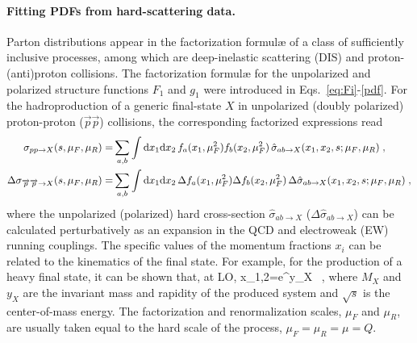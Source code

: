 \paragraph*{Fitting PDFs from hard-scattering data.} 
Parton distributions appear in the factorization formul{\ae} of a class of 
sufficiently inclusive processes, among which are deep-inelastic scattering 
(DIS) and proton-(anti)proton collisions.
%
The factorization formul{\ae} for the unpolarized and polarized structure 
functions $F_1$ and $g_1$ were introduced in Eqs.~\eqref{eq:Fi}-\eqref{pdf}.
%
For the hadroproduction of a generic final-state $X$ in unpolarized 
(doubly polarized) proton-proton ($\overrightarrow{p}\overrightarrow{p}$) 
collisions, the corresponding factorized expressions read
\begin{align}
\sigma_{pp\to X}(s,\mu_F,\mu_R)=&\sum_{a,b}\int {\rm d}x_1 {\rm d}x_2\, 
f_a(x_1,\mu_F^2)f_b(x_2,\mu_F^2)\,
\hat{\sigma}_{ab\to X}(x_1,x_2,s;\mu_{F},\mu_R)\;,
\label{eq:LHCxsecunp}
\\
\Delta\sigma_{\overrightarrow{p}\overrightarrow{p}\to X}(s,\mu_F,\mu_R)=&\sum_{a,b}\int {\rm d}x_1 {\rm d}x_2\, 
\Delta f_a(x_1,\mu_F^2)\Delta f_b(x_2,\mu_F^2)\,
\Delta\hat{\sigma}_{ab\to X}(x_1,x_2,s;\mu_{F},\mu_R)\;,
\label{eq:LHCxsecpol}
\end{align}
where the unpolarized (polarized) hard cross-section 
$\hat{\sigma}_{ab\to X}$ ($\Delta\hat{\sigma}_{ab\to X}$) can be calculated 
perturbatively as an expansion in the QCD and electroweak (EW) 
running couplings.
%
The specific values of the momentum fractions
$x_i$ can be related to the kinematics of the final state.
%
For example, for the production of a heavy final state, 
it can be shown that, at LO,
\be
x_{1,2}=e^{\pm y_X} \, ,
\ee
where $M_X$ and $y_X$ are the invariant mass and rapidity of the produced 
system and $\sqrt{s}$ is the center-of-mass energy.
%
The factorization and renormalization scales, $\mu_F$ and $\mu_R$, are 
usually taken equal to the hard scale of the process, $\mu_F=\mu_R=\mu=Q$.


